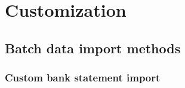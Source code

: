 


\part{Customization}
\label{part:Customization}

\chapter{Batch data import methods}

\section{Custom bank statement import}

